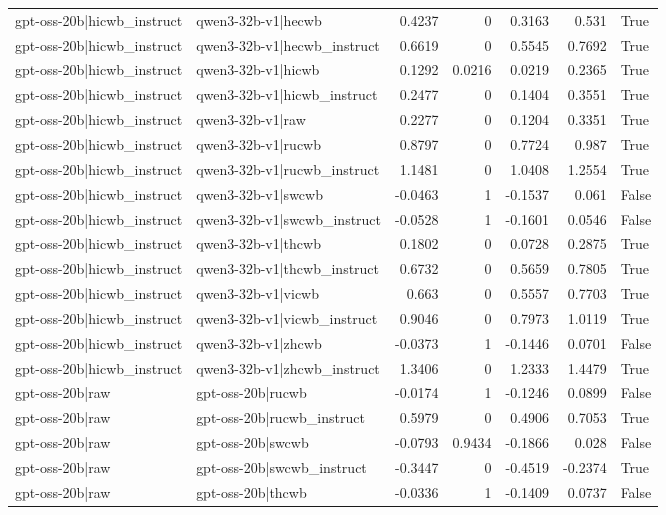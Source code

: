 \begin{table}
\begin{tabular}{l l r r r r l}
gpt-oss-20b|hicwb_instruct & qwen3-32b-v1|hecwb & 0.4237 & 0 & 0.3163 & 0.531 & True \\
gpt-oss-20b|hicwb_instruct & qwen3-32b-v1|hecwb_instruct & 0.6619 & 0 & 0.5545 & 0.7692 & True \\
gpt-oss-20b|hicwb_instruct & qwen3-32b-v1|hicwb & 0.1292 & 0.0216 & 0.0219 & 0.2365 & True \\
gpt-oss-20b|hicwb_instruct & qwen3-32b-v1|hicwb_instruct & 0.2477 & 0 & 0.1404 & 0.3551 & True \\
gpt-oss-20b|hicwb_instruct & qwen3-32b-v1|raw & 0.2277 & 0 & 0.1204 & 0.3351 & True \\
gpt-oss-20b|hicwb_instruct & qwen3-32b-v1|rucwb & 0.8797 & 0 & 0.7724 & 0.987 & True \\
gpt-oss-20b|hicwb_instruct & qwen3-32b-v1|rucwb_instruct & 1.1481 & 0 & 1.0408 & 1.2554 & True \\
gpt-oss-20b|hicwb_instruct & qwen3-32b-v1|swcwb & -0.0463 & 1 & -0.1537 & 0.061 & False \\
gpt-oss-20b|hicwb_instruct & qwen3-32b-v1|swcwb_instruct & -0.0528 & 1 & -0.1601 & 0.0546 & False \\
gpt-oss-20b|hicwb_instruct & qwen3-32b-v1|thcwb & 0.1802 & 0 & 0.0728 & 0.2875 & True \\
gpt-oss-20b|hicwb_instruct & qwen3-32b-v1|thcwb_instruct & 0.6732 & 0 & 0.5659 & 0.7805 & True \\
gpt-oss-20b|hicwb_instruct & qwen3-32b-v1|vicwb & 0.663 & 0 & 0.5557 & 0.7703 & True \\
gpt-oss-20b|hicwb_instruct & qwen3-32b-v1|vicwb_instruct & 0.9046 & 0 & 0.7973 & 1.0119 & True \\
gpt-oss-20b|hicwb_instruct & qwen3-32b-v1|zhcwb & -0.0373 & 1 & -0.1446 & 0.0701 & False \\
gpt-oss-20b|hicwb_instruct & qwen3-32b-v1|zhcwb_instruct & 1.3406 & 0 & 1.2333 & 1.4479 & True \\
gpt-oss-20b|raw & gpt-oss-20b|rucwb & -0.0174 & 1 & -0.1246 & 0.0899 & False \\
gpt-oss-20b|raw & gpt-oss-20b|rucwb_instruct & 0.5979 & 0 & 0.4906 & 0.7053 & True \\
gpt-oss-20b|raw & gpt-oss-20b|swcwb & -0.0793 & 0.9434 & -0.1866 & 0.028 & False \\
gpt-oss-20b|raw & gpt-oss-20b|swcwb_instruct & -0.3447 & 0 & -0.4519 & -0.2374 & True \\
gpt-oss-20b|raw & gpt-oss-20b|thcwb & -0.0336 & 1 & -0.1409 & 0.0737 & False \\

\end{tabular}
\end{table}
